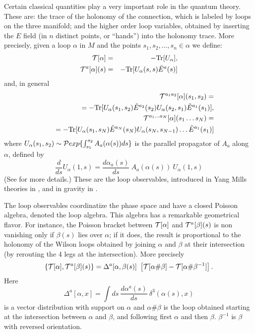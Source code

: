 Certain classical quantities play a very important role in the 
quantum theory.  These are: the trace of the holonomy of the 
connection, which is labeled by loops on the three manifold; and 
the higher order loop variables, obtained by inserting the $E$ 
field (in $n$ distinct points, or ``hands'') into the holonomy 
trace.  More precisely, given a loop $\alpha$ in $M$ and the 
points $s_1,s_2,\ldots,s_n\in\alpha$ we define:
 \begin{eqnarray}
  {\cal T}[\alpha]          &=& - {\rm Tr} [U_\alpha] ,
\label{t0}  \\
  {\cal T}^a[\alpha](s)     
      &=& - {\rm Tr} [U_\alpha(s,s) \tilde{E}^a(s)] 
\label{t1}
\end{eqnarray}
and, in general
\begin{eqnarray}
&&{\cal T}^{a_1a_2}[\alpha](s_1,s_2) = \nonumber \\  
&&\ \ =  - {\rm Tr} [U_\alpha(s_1,s_2) \tilde{E}^{a_2}(s_2) 
                U_\alpha(s_2,s_1) \tilde{E}^{a_1}(s_1) ] ,
\label{tn} \\
&& {\cal T}^{a_1\ldots a_N}[\alpha](s_1 \ldots s_N) = 
\nonumber \\  
&& \ \ = 
- {\rm Tr} [U_\alpha(s_1,s_N) \tilde{E}^{a_N}(s_N)
                U_\alpha(s_N,s_{N-1}) \ldots 
\tilde{E}^{a_1}(s_1) ]  
\nonumber
\end{eqnarray}
 where $U_{\alpha}(s_{1},s_{2})\sim{\cal P} exp 
 \{\int_{s_{1}}^{s_{2}} 
 A_{a}(\alpha(s))ds \}$ is the parallel propagator of $A_a$ along 
 $\alpha$, defined by 
 \begin{equation}
	 \frac{d}{ds}U_{\alpha}(1,s) = \frac{d\alpha_{a}(s)}{ds} \ 
	 A_{a}(\alpha(s))\ U_{\alpha}(1,s)
 \end{equation}
  (See \cite{DePietriRovelli} for more details.)  These are the 
  loop observables, introduced in Yang Mills theories in 
  \cite{GambiniTrias2,GambiniTrias}, and in gravity in 
  \cite{RovelliSmolin88,RovelliSmolin90}.

  The loop observables coordinatize the phase space and have a 
  closed Poisson algebra, denoted the loop algebra.  This algebra 
  has a remarkable geometrical flavor.  For instance, the Poisson 
  bracket between ${\cal T}[\alpha]$ and ${\cal T}^a[\beta](s)$ 
  is non vanishing only if $\beta(s)$ lies over $\alpha$; if it 
  does, the result is proportional to the holonomy of the Wilson 
  loops obtained by joining $\alpha$ and $\beta$ at their 
  intersection (by rerouting the 4 legs at the intersection).  
  More precisely
\begin{equation}
	\{{\cal T}[\alpha], {\cal T}^a[\beta](s) \} =
	\Delta^{a}[\alpha,\beta(s)] \ \left[{\cal T}
	[\alpha\#\beta]-{\cal T}[\alpha\#\beta^{-1}]\right].
\end{equation}
Here 
\begin{equation}
		\Delta^{a}[\alpha,x] = \int ds\ 
		\frac{d\alpha^{a}(s)}{ds}\ \delta^{3}(\alpha(s),x)
	\label{Delta}
\end{equation}
is a vector distribution with support on $\alpha$ and 
$\alpha\#\beta$ is the loop obtained starting at the intersection 
between $\alpha$ and $\beta$, and following first $\alpha$ and 
then $\beta$.  $\beta^{-1}$ is $\beta$ with reversed orientation.

